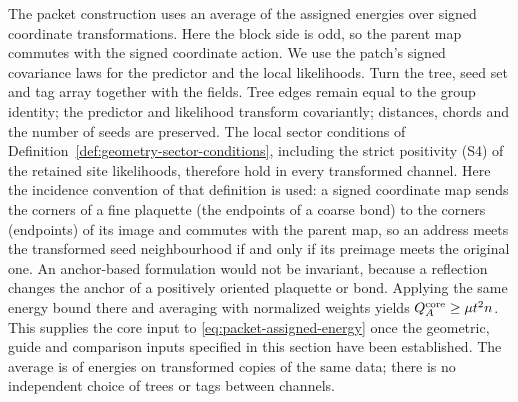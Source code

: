 The packet construction uses an average of the assigned energies over
signed coordinate transformations. Here the block side is odd, so
the parent map commutes with the signed coordinate action. We use
the patch's signed covariance laws for the predictor and the local
likelihoods. Turn the tree, seed set and tag array together with the fields. Tree edges remain equal to the group
identity; the predictor and likelihood transform covariantly; distances,
chords and the number of seeds are preserved. The local sector
conditions of Definition~\ref{def:geometry-sector-conditions},
including the strict positivity (S4) of the retained site
likelihoods, therefore hold in every transformed channel. Here the
incidence convention of that definition is used: a signed coordinate
map sends the corners of a fine plaquette (the endpoints of a coarse
bond) to the corners (endpoints) of its image and commutes with the
parent map, so an address meets the transformed seed neighbourhood if
and only if its preimage meets the original one. An anchor-based
formulation would not be invariant, because a reflection changes the
anchor of a positively oriented plaquette or bond. Applying the
same energy bound there and averaging with normalized weights yields
$Q_A^{\rm core}\ge\mu t^2n$. This supplies the core input to
\eqref{eq:packet-assigned-energy} once the geometric, guide and
comparison inputs specified in this section have been established.
The average is of energies on transformed copies of the same data;
there is no independent choice of trees or tags between channels.
